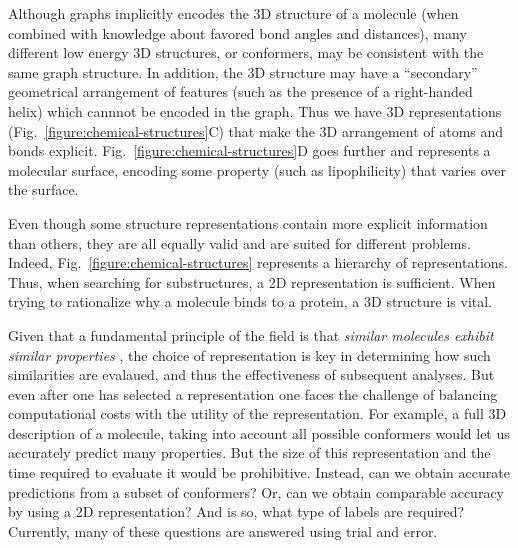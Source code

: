 \documentclass{sig-alternate}
\begin{document}
Although graphs implicitly encodes the 3D structure of a molecule
(when combined with knowledge about favored bond angles and
distances), many different low energy 3D structures, or conformers,
may be consistent with the same graph structure. In addition, the 3D
structure may have a ``secondary'' geometrical arrangement of features
(such as the presence of a right-handed helix) which cannnot be
encoded in the graph. Thus we have 3D representations  
(Fig.~\ref{figure:chemical-structures}C) that make the 3D arrangement
of atoms and bonds explicit. Fig.~\ref{figure:chemical-structures}D
goes further and represents a molecular surface, encoding some
property (such as lipophilicity) that varies over the surface.

Even though some structure representations contain more explicit
information than others, they are all equally valid and are suited for
different problems. Indeed, Fig.~\ref{figure:chemical-structures}
represents a hierarchy of representations. Thus, when searching for
substructures, a 2D representation is sufficient. When trying to
rationalize why a molecule binds to a protein, a 3D structure is
vital.

Given that a fundamental principle of the field is that \emph{similar
  molecules exhibit similar properties} \cite{Johnson:1990qf}, the
choice of representation is key in determining how such similarities
are evalaued, and thus the effectiveness of subsequent analyses. But
even after one has selected a representation one faces the challenge
of balancing computational costs with the utility of the
representation. For example, a full 3D description of a molecule,
taking into account all possible conformers would let us accurately
predict many properties. But the size of this representation and the
time required to evaluate it would be prohibitive. Instead, can we
obtain accurate predictions from a subset of conformers? Or, can we
obtain comparable accuracy by using a 2D representation? And is so,
what type of labels are required? Currently, many of these questions
are answered using trial and error.
\end{document}

